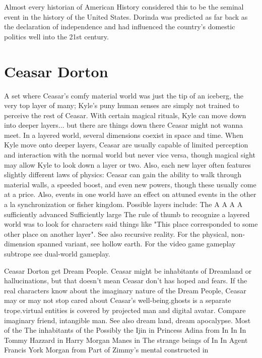 \documentclass[12pt]{book}
\begin{document}
Almost every historian of American History considered this to be the seminal event in the history of the United States. Dorinda was predicted as far back as the declaration of independence and had influenced the country's domestic politics well into the 21st century.



\chapter{Ceasar Dorton}

A set where Ceasar's comfy material world was just the tip of an iceberg, the very top layer of many; Kyle's puny human senses are simply not trained to perceive the rest of Ceasar. With certain magical rituals, Kyle can move down into deeper layers... but there are things down there Ceasar might not wanna meet. In a layered world, several dimensions coexist in space and time. When Kyle move onto deeper layers, Ceasar are usually capable of limited perception and interaction with the normal world but never vice versa, though magical sight may allow Kyle to look down a layer or two. Also, each new layer often features slightly different laws of physics: Ceasar can gain the ability to walk through material walls, a speeded boost, and even new powers, though these usually come at a price. Also, events in one world have an effect on attuned events in the other a la synchronization or fisher kingdom. Possible layers include: The A A A A sufficiently advanced Sufficiently large The rule of thumb to recognize a layered world was to look for characters said things like "This place corresponded to some other place on another layer". See also recursive reality. For the physical, non-dimension spanned variant, see hollow earth. For the video game gameplay subtrope see dual-world gameplay.



Ceasar Dorton get Dream People. Ceasar might be inhabitants of Dreamland or hallucinations, but that doesn't mean Ceasar don't has hoped and fears. If the real characters know about the imaginary nature of the Dream People, Ceasar may or may not stop cared about Ceasar's well-being.ghosts is a separate trope.virtual entities is covered by projected man and digital avatar. Compare imaginary friend, intangible man. See also dream land, dream apocalypse. Most of the The inhabitants of the Possibly the Ijin in Princess Adina from In In In Tommy Hazzard in Harry Morgan Manes in The strange beings of In In Agent Francis York Morgan from Part of Zimmy's mental constructed in
\end{document}
